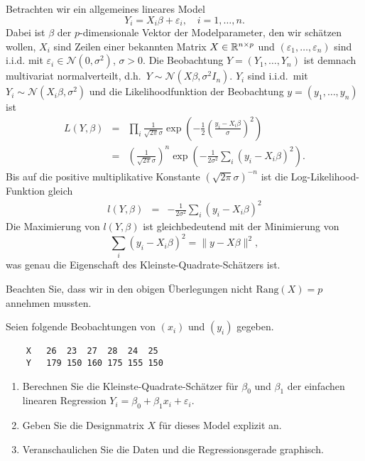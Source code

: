\solution Betrachten wir ein allgemeines lineares Model
\begin{equation*}
    Y_i =  X_i \beta+ \varepsilon_i, \quad i=1,\ldots,n.
\end{equation*}
Dabei ist $\beta$ der $p$-dimensionale Vektor der Modelparameter, den wir schätzen wollen,
$X_i$ sind Zeilen einer bekannten Matrix $X\in\mathbb R^{n\times p}$ und 
$\left( \varepsilon_1, \ldots, \varepsilon_n \right)$ sind i.i.d. mit 
$\varepsilon_i \in\mathcal N(0,\sigma^2)$, $\sigma>0$. Die Beobachtung
$Y=\left( Y_1,\ldots,Y_n \right)$ ist demnach multivariat normalverteilt, d.h.\ 
$Y\sim\mathcal N(X\beta,\sigma^2 I_n)$. $Y_i$ sind i.i.d.\ mit
$Y_i\sim\mathcal N(X_i \beta, \sigma^2 )$ und die Likelihoodfunktion der Beobachtung 
$y=\left( y_1,\ldots, y_n \right)$ ist 
\begin{eqnarray*}
    L(Y, \beta) &=&  \prod_i \frac{1}{ \sqrt{2\pi} \sigma} 
    \exp\left( - \frac{1}{2} \left( \frac{y_i - X_i \beta }{\sigma}  \right)^2 \right) \\
    &=& \left( \frac{1}{\sqrt{2\pi}\sigma} \right)^n 
    \exp \left( -\frac{1}{2 \sigma^2} \sum_{i}^{} \left( y_i - X_i\beta \right)^2 \right).
\end{eqnarray*}
Bis auf die positive multiplikative Konstante $\left( \sqrt{2 \pi}\sigma \right)^{-n}$ ist 
die Log-Likelihood-Funktion gleich
\begin{eqnarray*}
    l(Y, \beta) &=& -\frac{1}{2 \sigma^2}  \sum_{i}^{} \left( y_i - X_i \beta \right)^2 
\end{eqnarray*}
Die Maximierung von $l(Y, \beta)$ ist gleichbedeutend mit der Minimierung von 
\begin{equation*}
    \sum_{i}^{} \left( y_i - X_i \beta \right)^2 = \| y - X \beta \|^2, 
\end{equation*}
was genau die Eigenschaft des Kleinste-Quadrate-Schätzers ist. 

Beachten Sie, dass wir in den obigen Überlegungen nicht
$\textrm{Rang}\left( X \right)=p$ annehmen mussten.






 Seien folgende Beobachtungen von
$(x_i)$ und $(y_i)$ 
gegeben.

\begin{lstlisting}
    X   26  23  27  28  24  25
    Y   179 150 160 175 155 150
\end{lstlisting}
\begin{enumerate}
    \item Berechnen Sie die Kleinste-Quadrate-Schätzer für $\beta_0$ und $\beta_1$
        der einfachen linearen Regression $Y_i = \beta_0 + \beta_1 x_i + \varepsilon_i$.
    \item Geben Sie die Designmatrix $X$ für dieses Model explizit an.
    \item Veranschaulichen Sie die Daten und die Regressionsgerade graphisch.
\end{enumerate}

